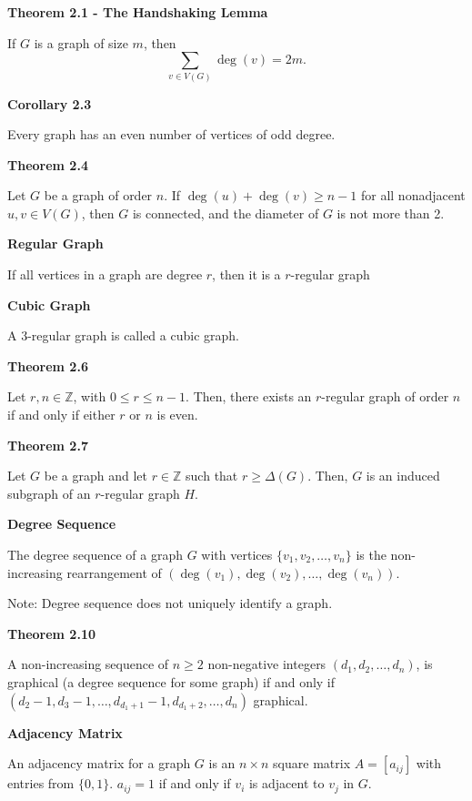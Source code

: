 \documentclass{article}
\begin{document}
\medskip\noindent\textbf{Theorem 2.1 - The Handshaking Lemma}

    If $G$ is a graph of size $m$, then $$\sum_{v \in V(G)} \deg(v) = 2m.$$

\medskip\noindent\textbf{Corollary 2.3}

    Every graph has an even number of vertices of odd degree.

\medskip\noindent\textbf{Theorem 2.4}

    Let $G$ be a graph of order $n$. If $\deg(u) + \deg(v) \geq n-1$ for all nonadjacent $u,v \in V(G)$, then $G$ is connected, and the diameter of $G$ is not more than 2.

\medskip\noindent\textbf{}

\medskip\noindent\textbf{Regular Graph}

    If all vertices in a graph are degree $r$, then it is a $r$-regular graph

\medskip\noindent\textbf{Cubic Graph}

    A 3-regular graph is called a cubic graph.

\medskip\noindent\textbf{Theorem 2.6}

    Let $r, n \in \mathbb Z$, with $0 \leq r \leq n-1$. Then, there exists an $r$-regular graph of order $n$ if and only if either $r$ or $n$ is even.

\medskip\noindent\textbf{Theorem 2.7}

    Let $G$ be a graph and let $r \in \mathbb Z$ such that $r \geq \Delta(G)$. Then, $G$ is an induced subgraph of an $r$-regular graph $H$.

\medskip\noindent\textbf{Degree Sequence}

    The degree sequence of a graph $G$ with vertices $\{v_1, v_2, \hdots, v_n\}$ is the non-increasing rearrangement of $(\deg(v_1), \deg(v_2), \hdots, \deg(v_n))$.

    Note: Degree sequence does not uniquely identify a graph.

\medskip\noindent\textbf{Theorem 2.10}

    A non-increasing sequence of $n \geq 2$ non-negative integers $(d_1, d_2, \hdots, d_n)$, is graphical (a degree sequence for some graph) if and only if $(d_2-1, d_3-1, \hdots, d_{d_1+1}-1, d_{d_1+2}, \hdots, d_n)$ graphical.

\medskip\noindent\textbf{Adjacency Matrix}

    An adjacency matrix for a graph $G$ is an $n \times n$ square matrix $A = [a_{ij}]$ with entries from $\{0, 1\}$.
    $a_{ij} = 1$ if and only if $v_i$ is adjacent to $v_j$ in $G$.
\end{document}
